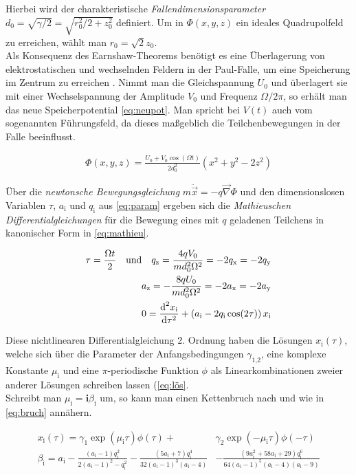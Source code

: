 \documentclass[numbers=noenddot,a4paper,notitlepage,twoside,BCOR15mm]{scrartcl}
\newcommand{\diff}{\textnormal{d}}
\newcommand{\ix}[1]{_\text{#1}}
\newcommand{\imag}{\mathbf{i}}
\newcommand{\tilt}[1]{\textit{#1}}
\begin{document}
		Hierbei wird der charakteristische \tilt{Fallendimensionsparameter} $d\ix{0}=\sqrt{\gamma/2}=\sqrt{r\ix{0}^2/2+z\ix{0}^2}$ definiert. Um in $\Phi(x,y,z)$ ein ideales Quadrupolfeld zu erreichen, wählt man $r\ix{0}=\sqrt{2}z\ix{0}$.\\
		Als Konsequenz des Earnshaw-Theorems benötigt es eine Überlagerung von elektrostatischen und wechselnden Feldern in der Paul-Falle, um eine Speicherung im Zentrum zu erreichen \cite{EarnPaul} \cite{Paul}. Nimmt man die Gleichspannung $U\ix{0}$ und überlagert sie mit einer Wechselspannung der Amplitude $V\ix{0}$ und Frequenz $\Omega/2\pi$, so erhält man das neue Speicherpotential \autoref{eq:neupot}. Man spricht bei $V(t)$ auch vom sogenannten Führungsfeld, da dieses maßgeblich die Teilchenbewegungen in der Falle beeinflusst.

			\begin{align}
				\Phi(x,y,z)=\frac{U\ix{0}+V\ix{0}\cos(\Omega t)}{2d\ix{0}^2}(x^2+y^2-2z^2) \label{eq:neupot}
			\end{align}

		Über die \tilt{newtonsche Bewegungsgleichung} $m\ddot{\vec{x}}=-q\vec{\nabla}\Phi$ und den dimensionslosen Variablen $\tau$, $a\ix{i}$ und $q\ix{i}$ aus \autoref{eq:param} ergeben sich die \tilt{Mathieuschen Differentialgleichungen} für die Bewegung eines mit $q$ geladenen Teilchens in kanonischer Form in \autoref{eq:mathieu}.

			\begin{align}
				\tau=\frac{\Omega t}{2} \quad \text{und} \quad q\ix{z}=\frac{4qV\ix{0}}{md\ix{0}^2\Omega^2}=-2q\ix{x}=-2q\ix{y} \label{eq:param}\\
				a\ix{z}=-\frac{8qU\ix{0}}{md\ix{0}^2\Omega^2}=-2a\ix{x}=-2a\ix{y} \nonumber \\
				0=\frac{\diff^2x\ix{i}}{\diff\tau^2}+\left(a\ix{i}-2q\ix{i}\cos(2\tau)\right)x\ix{i} \label{eq:mathieu}
			\end{align}

		Diese nichtlinearen Differentialgleichung 2. Ordnung haben die Lösungen $x\ix{i}(\tau)$, welche sich über die Parameter der Anfangsbedingungen $\gamma\ix{1,2}$, eine komplexe Konstante $\mu\ix{i}$ und eine $\pi$-periodische Funktion $\phi$ als Linearkombinationen zweier anderer Lösungen schreiben lassen (\autoref{eq:lös}.\\
		Schreibt man $\mu\ix{i}=\imag\beta\ix{i}$ um, so kann man einen Kettenbruch nach \cite{Bruch} und \cite{Bruch2} wie in \autoref{eq:bruch} annähern.

			\begin{align}
				x\ix{i}(\tau)=\gamma\ix{1}\exp(\mu\ix{i}\tau)\phi(\tau)+&\gamma\ix{2}\exp(-\mu\ix{i}\tau)\phi(-\tau) \label{eq:lös} \\
				\beta\ix{i}=a\ix{i}-\frac{(a\ix{i}-1)q\ix{i}^2}{2(a\ix{i}-1)^2-q\ix{i}^2}-\frac{(5a\ix{i}+7)q\ix{i}^4}{32(a\ix{i}-1)^3(a\ix{i}-4)}&-\frac{(9a\ix{i}^2+58a\ix{i}+29)q\ix{i}^6}{64(a\ix{i}-1)^5(a\ix{i}-4)(a\ix{i}-9)} \label{eq:bruch}
			\end{align}
\end{document}
